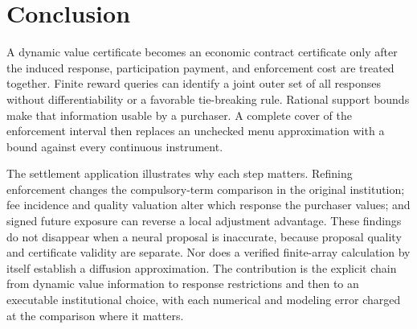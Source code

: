 \section{Conclusion}
A dynamic value certificate becomes an economic contract certificate only after the induced response, participation payment, and enforcement cost are treated together. Finite reward queries can identify a joint outer set of all responses without differentiability or a favorable tie-breaking rule. Rational support bounds make that information usable by a purchaser. A complete cover of the enforcement interval then replaces an unchecked menu approximation with a bound against every continuous instrument.

The settlement application illustrates why each step matters. Refining enforcement changes the compulsory-term comparison in the original institution; fee incidence and quality valuation alter which response the purchaser values; and signed future exposure can reverse a local adjustment advantage. These findings do not disappear when a neural proposal is inaccurate, because proposal quality and certificate validity are separate. Nor does a verified finite-array calculation by itself establish a diffusion approximation. The contribution is the explicit chain from dynamic value information to response restrictions and then to an executable institutional choice, with each numerical and modeling error charged at the comparison where it matters.
